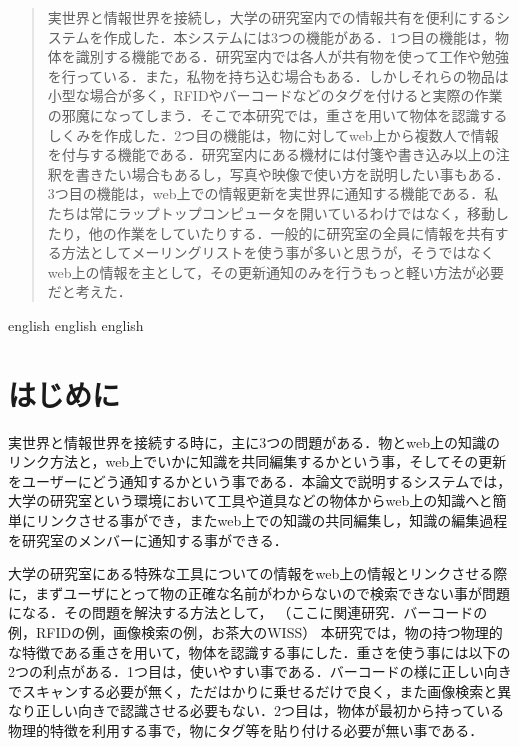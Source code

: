 
\begin{abstract}
実世界と情報世界を接続し，大学の研究室内での情報共有を便利にするシステムを作成した．本システムには3つの機能がある．1つ目の機能は，物体を識別する機能である．研究室内では各人が共有物を使って工作や勉強を行っている．また，私物を持ち込む場合もある．しかしそれらの物品は小型な場合が多く，RFIDやバーコードなどのタグを付けると実際の作業の邪魔になってしまう．そこで本研究では，重さを用いて物体を認識するしくみを作成した．2つ目の機能は，物に対してweb上から複数人で情報を付与する機能である．研究室内にある機材には付箋や書き込み以上の注釈を書きたい場合もあるし，写真や映像で使い方を説明したい事もある．3つ目の機能は，web上での情報更新を実世界に通知する機能である．私たちは常にラップトップコンピュータを開いているわけではなく，移動したり，他の作業をしていたりする．一般的に研究室の全員に情報を共有する方法としてメーリングリストを使う事が多いと思うが，そうではなくweb上の情報を主として，その更新通知のみを行うもっと軽い方法が必要だと考えた．
\end{abstract}

\begin{eabstract}
english english english
\end{eabstract}

\maketitle

\section{はじめに}\label{sec:Introduction}
実世界と情報世界を接続する時に，主に3つの問題がある．物とweb上の知識のリンク方法と，web上でいかに知識を共同編集するかという事，そしてその更新をユーザーにどう通知するかという事である．本論文で説明するシステムでは，大学の研究室という環境において工具や道具などの物体からweb上の知識へと簡単にリンクさせる事ができ，またweb上での知識の共同編集し，知識の編集過程を研究室のメンバーに通知する事ができる．

大学の研究室にある特殊な工具についての情報をweb上の情報とリンクさせる際に，まずユーザにとって物の正確な名前がわからないので検索できない事が問題になる．その問題を解決する方法として，
（ここに関連研究．バーコードの例，RFIDの例，画像検索の例，お茶大のWISS）
本研究では，物の持つ物理的な特徴である重さを用いて，物体を認識する事にした．重さを使う事には以下の2つの利点がある．1つ目は，使いやすい事である．バーコードの様に正しい向きでスキャンする必要が無く，ただはかりに乗せるだけで良く，また画像検索と異なり正しい向きで認識させる必要もない．2つ目は，物体が最初から持っている物理的特徴を利用する事で，物にタグ等を貼り付ける必要が無い事である．

